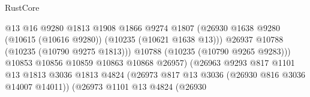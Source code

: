\begin{lexlean}{RustCore}
\begin{coremodule}
                                                      @13
                                                      @16
                                                      @9280
                                                      @1813
                                                      @1908
                                                      @1866
                                                      @9274
                                                      @1807
                                                      (@26930
                                                        @1638
                                                        @9280
                                                        (@10615 (@10616 @9280))
                                                        (@10235 (@10621 @1638 @13)))
                                                      @26937
                                                      @10788
                                                      (@10235 (@10790 @9275 @1813)))
                                                    @10788
                                                    (@10235 (@10790 @9265 @9283)))
                                                  @10853
                                                  @10856
                                                  @10859
                                                  @10863
                                                  @10868
                                                  @26957)
                                                (@26963
                                                  @9293
                                                  @817
                                                  @1101
                                                  @13
                                                  @1813
                                                  @3036
                                                  @1813
                                                  @4824
                                                  (@26973
                                                    @817
                                                    @13
                                                    @3036
                                                    (@26930 @816 @3036 @14007 @14011))
                                                  (@26973
                                                    @1101
                                                    @13
                                                    @4824
                                                    (@26930

\end{coremodule}
\end{lexlean}
